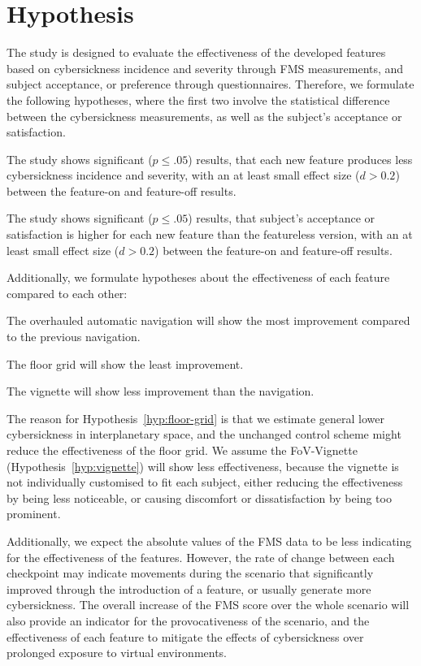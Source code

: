 \section{Hypothesis}\label{sec:hypothesis}

The study is designed to evaluate the effectiveness of the developed features based on cybersickness incidence and
severity through FMS measurements, and subject acceptance, or preference through questionnaires.
Therefore, we formulate the following hypotheses, where the first two involve the statistical difference between
the cybersickness measurements, as well as the subject's acceptance or satisfaction.
\begin{hypothesis}
    \label{hyp:cybersickness}
    The study shows significant ($p \leq .05$) results, that each new feature produces less cybersickness incidence
    and
    severity, with an at least small effect size ($d > 0.2$) between the feature-on and feature-off results.
\end{hypothesis}
\begin{hypothesis}
    \label{hyp:satisfaction}
    The study shows significant ($p \leq .05$) results, that subject's acceptance or satisfaction is higher for each new
    feature than the featureless version, with an at least small effect size ($d > 0.2$) between the feature-on and
    feature-off results.
\end{hypothesis}

Additionally, we formulate hypotheses about the effectiveness of each feature compared to each other:
\begin{hypothesis}
    \label{hyp:navigation}
    The overhauled automatic navigation will show the most improvement compared to the previous navigation.
\end{hypothesis}
\begin{hypothesis}
    \label{hyp:floor-grid}
    The floor grid will show the least improvement.
\end{hypothesis}
\begin{hypothesis}
    \label{hyp:vignette}
    The vignette will show less improvement than the navigation.
\end{hypothesis}
The reason for Hypothesis~\ref{hyp:floor-grid} is that we estimate general lower cybersickness in interplanetary
space, and the unchanged control scheme might reduce the effectiveness of the floor grid.
We assume the FoV-Vignette (Hypothesis~\ref{hyp:vignette}) will show less effectiveness, because the vignette is not
individually customised to fit each subject, either reducing the effectiveness by being less noticeable, or causing
discomfort or dissatisfaction by being too prominent.

Additionally, we expect the absolute values of the FMS data to be less indicating for the effectiveness of the
features.
However, the rate of change between each checkpoint may indicate movements during the scenario that significantly
improved through the introduction of a feature, or usually generate more cybersickness.
The overall increase of the FMS score over the whole scenario will also provide an indicator for the provocativeness
of the scenario, and the effectiveness of each feature to mitigate the effects of cybersickness over prolonged exposure
to virtual environments.
